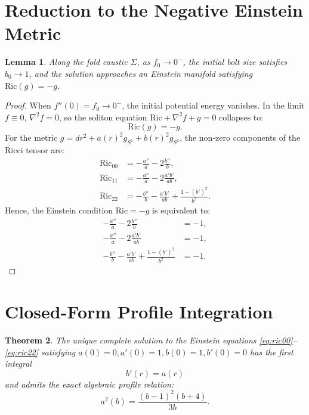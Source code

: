 \documentclass[12pt]{article}
\newtheorem{theorem}{Theorem}
\newtheorem{lemma}[theorem]{Lemma}
\begin{document}
\section{Reduction to the Negative Einstein Metric}

\begin{lemma}
Along the fold caustic $\Sigma$, as $f_0 \to 0^-$, the initial bolt size satisfies $b_0 \to 1$, and the solution approaches an Einstein manifold satisfying $\text{Ric}(g) = -g$.
\end{lemma}

\begin{proof}
When $f''(0) = f_0 \to 0^-$, the initial potential energy vanishes. In the limit $f \equiv 0$, $\nabla^2 f = 0$, so the soliton equation $\text{Ric} + \nabla^2 f + g = 0$ collapses to:
\begin{equation}
\text{Ric}(g) = -g.
\end{equation}
For the metric $g = dr^2 + a(r)^2 g_{S^1} + b(r)^2 g_{S^2}$, the non-zero components of the Ricci tensor are:
\begin{align}
\text{Ric}_{00} &= -\frac{a''}{a} - 2\frac{b''}{b}, \\
\text{Ric}_{11} &= -\frac{a''}{a} - 2\frac{a'b'}{ab}, \\
\text{Ric}_{22} &= -\frac{b''}{b} - \frac{a'b'}{ab} + \frac{1 - (b')^2}{b^2}.
\end{align}
Hence, the Einstein condition $\text{Ric} = -g$ is equivalent to:
\begin{align}
-\frac{a''}{a} - 2\frac{b''}{b} &= -1, \label{eq:ric00} \\
-\frac{a''}{a} - 2\frac{a'b'}{ab} &= -1, \label{eq:ric11} \\
-\frac{b''}{b} - \frac{a'b'}{ab} + \frac{1 - (b')^2}{b^2} &= -1. \label{eq:ric22}
\end{align}
\end{proof}

\section{Closed-Form Profile Integration}

\begin{theorem}
The unique complete solution to the Einstein equations \eqref{eq:ric00}--\eqref{eq:ric22} satisfying $a(0)=0, a'(0)=1, b(0)=1, b'(0)=0$ has the first integral
\begin{equation}
b'(r) = a(r)
\end{equation}
and admits the exact algebraic profile relation:
\begin{equation}
a^2(b) = \frac{(b - 1)^2 (b + 4)}{3b}. \label{eq:exact_profile}
\end{equation}
\end{theorem}
\end{document}
